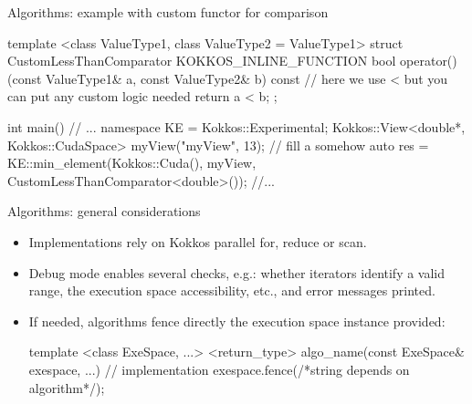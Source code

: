 \begin{frame}[fragile]{Algorithms: example with custom functor for comparison}

  \hspace{-40pt}
  \begin{code} %

     template <class ValueType1, class ValueType2 = ValueType1>
     struct CustomLessThanComparator {
       KOKKOS_INLINE_FUNCTION
       bool operator()(const ValueType1& a, const ValueType2& b) const
       {
        // here we use < but you can put any custom logic needed
        return a < b;
       }
     };

     int main(){
       // ...
       namespace KE = Kokkos::Experimental;
       Kokkos::View<double*, Kokkos::CudaSpace> myView("myView", 13);
       // fill a somehow
       auto res = KE::min_element(Kokkos::Cuda(), myView,
                                  CustomLessThanComparator<double>());
       //...
     }
  \end{code}
\end{frame}


\begin{frame}[fragile]{Algorithms: general considerations}

\begin{itemize}
\item Implementations rely on Kokkos parallel for, reduce or scan.

\vspace{10pt}
\item Debug mode enables several checks, e.g.: whether iterators
  identify a valid range, the execution space accessibility, etc.,
  and error messages printed.

\vspace{10pt}
\item If needed, algorithms fence directly the execution space instance provided:
  \hspace{-40pt}
  \begin{code}
    template <class ExeSpace, ...>
    <return_type> algo_name(const ExeSpace& exespace, ...)
    {
      // implementation
      exespace.fence(/*string depends on algorithm*/);
    }
  \end{code}
\end{itemize}

\end{frame}

